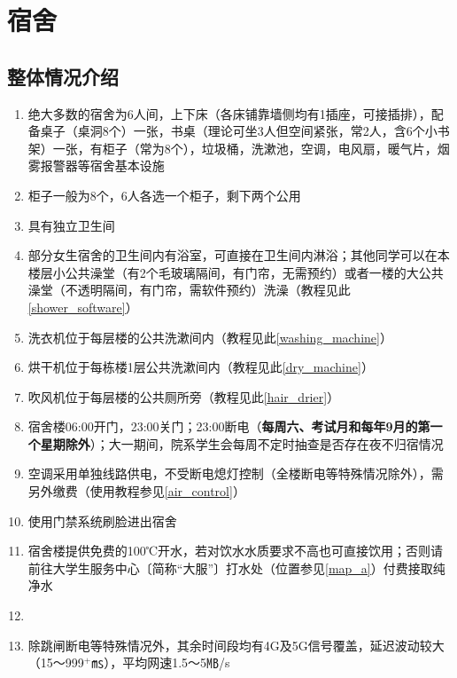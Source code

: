 \chapter[宿舍]{宿舍}

\section[整体情况介绍]{整体情况介绍}
\begin{enumerate}
      \item 绝大多数的宿舍为6人间，上下床（各床铺靠墙侧均有1插座，可接插排），配备桌子（桌洞8个）一张，书桌（理论可坐3人但空间紧张，常2人，含6个小书架）一张，有柜子（常为8个），垃圾桶，洗漱池，空调，电风扇，暖气片，烟雾报警器等宿舍基本设施
      \item 柜子\footnotemark 一般为8个，6人各选一个柜子，剩下两个公用
      \item 具有独立卫生间
      \item 部分女生宿舍的卫生间内有浴室，可直接在卫生间内淋浴；其他同学可以在本楼层小公共澡堂（有2个毛玻璃隔间，有门帘，无需预约）或者一楼的大公共澡堂（不透明隔间，有门帘，需软件预约）洗澡（教程见此\uline{\ref{shower_software}}）
      \item 洗衣机位于每层楼的公共洗漱间内（教程见此\uline{\ref{washing_machine}}）
      \item 烘干机位于每栋楼1层公共洗漱间内（教程见此\uline{\ref{dry_machine}}）
      \item 吹风机位于每层楼的公共厕所旁（教程见此\uline{\ref{hair_drier}}）
      \item 宿舍楼06:00开门，23:00关门；23:00断电（\textbf{每周六、考试月和每年9月的第一个星期除外}）；大一期间，院系学生会每周不定时抽查是否存在夜不归宿情况
      \item 空调采用单独线路供电，不受断电熄灯控制（全楼断电等特殊情况除外），需另外缴费（使用教程参见\uline{\ref{air_control}}）
      \item 使用门禁系统刷脸进出宿舍
      \item 宿舍楼提供免费的100℃开水\footnotemark，若对饮水水质要求不高也可直接饮用；否则请前往大学生服务中心〔简称“大服”〕打水处（位置参见\uline{\ref{map_a}}）付费接取纯净水
      \item \textbf{}
      \item 除跳闸断电等特殊情况外，其余时间段均有4G及5G信号覆盖，延迟波动较大（15～999$^+$㎳），平均网速1.5～5㎆/s
\end{enumerate}

